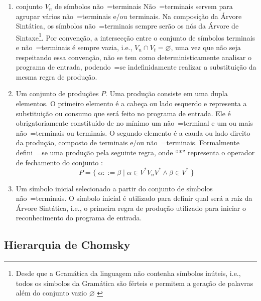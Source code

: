 {\begin{enumerate}
        \item {} conjunto $V_n$ de símbolos
        não~=terminais
        Não~=terminais servem para agrupar vários não~=terminais e\slash{}ou terminais.
        Na composição da Árvore Sintática,
        os símbolos não~=terminais sempre serão os nós da Árvore de Sintaxe\footnote{Desde que a Gramática da linguagem não contenha símbolos inúteis,
        i.e.,
        todos os símbolos da Gramática são férteis e
        permitem a geração de palavras além do conjunto vazio $\varnothing$ \cite{hopcroftBook}}.
        Por convenção,
        a intersecção entre o conjunto de símbolos terminais e
        não~=terminais é sempre vazia,
        i.e.,
        $V_n \cap V_t = \varnothing$,
        uma vez que não seja respeitando essa convenção,
        não se tem como deterministicamente analisar o programa de entrada,
        podendo~=se indefinidamente realizar a substituição da mesma regra de produção.

        \item \label{definicaoDeGramatica}Um conjunto de produções $P$.
        Uma produção consiste em uma dupla elementos.
        O primeiro elemento é a cabeça ou
        lado esquerdo e
        representa a substituição ou
        consumo que será feito no programa de entrada.
        Ele é obrigatoriamente constituído de no mínimo um não~=terminal e
        um ou mais não~=terminais ou
        terminais.
        O segundo elemento é a cauda ou
        lado direito da produção,
        composto de terminais e\slash{}ou não~=terminais.
        Formalmente defini~=se uma produção pela seguinte regra,
        onde ``*'' representa o operador de fechamento do conjunto \cite{hopcroftBook}:
        $$P = \{\; \alpha ::= \beta \;|\; \alpha \in V^* V_n V^* \land \beta \in V^* \;\}$$

        \item Um símbolo inicial selecionado a partir do conjunto de símbolos não~=terminais.
        O símbolo inicial é utilizado para definir qual será a raíz da Árvore Sintática,
        i.e.,
        o primeira regra de produção utilizado para iniciar o reconhecimento do programa de entrada.
    \end{enumerate}


\subsection{Hierarquia de Chomsky}

}
